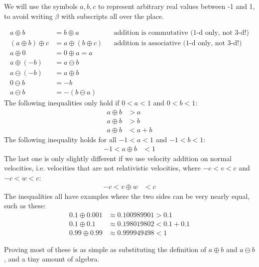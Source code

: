 \documentclass[a4paper]{article}
\theoremstyle{plain}
\theoremstyle{definition}
\begin{document}
We will use the symbols $a, b, c$ to represent arbitrary real values
between -1 and 1, to avoid writing $\beta$ with subscripts all over
the place.

\begin{align}
a \oplus b & = b \oplus a & & \text{addition is commutative (1-d only, not 3-d!)} \label{defn:1dreladdcommutative} \\
(a \oplus b) \oplus c & = a \oplus (b \oplus c) & & \text{addition is associative (1-d only, not 3-d!)} \label{defn:1dreladdassociative} \\
a \oplus 0 & = 0 \oplus a = a \\
a \oplus (-b) & = a \ominus b \\
a \ominus (-b) & = a \oplus b \\
0 \ominus b & = -b \\
a \ominus b & = - (b \ominus a)
\end{align}
The following inequalities only hold if $0 < a < 1$ and $0 < b < 1$:
\begin{align}
a \oplus b & > a \label{inequal:reladdposlarger1} \\
a \oplus b & > b \label{inequal:reladdposlarger2} \\
a \oplus b & < a+b \label{inequal:reladdpossmallerthansum}
\end{align}
The following inequality holds for all $-1 < a < 1$ and $-1 < b < 1$:
\begin{align}
-1 < a \oplus b & < 1 \label{inequal:reladdpossmallerthanc}
\end{align}
The last one is only slightly different if we use velocity addition on
normal velocities, i.e. velocities that are not relativistic velocities,
where $-c < v < c$ and $-c < w < c$:
\begin{align}
-c < v \oplus w & < c \label{inequal:reladdpossmallerthanc2}
\end{align}
The inequalities all have examples where the two sides can be very
nearly equal, such as these:
\begin{align*}
0.1 \oplus 0.001 & \approx 0.100989901 > 0.1 \\
0.1 \oplus 0.1 & \approx 0.198019802 < 0.1+0.1 \\
0.99 \oplus 0.99 & \approx 0.999949498 < 1
\end{align*}

Proving most of these is as simple as substituting the definition of
$a \oplus b$ and $a \ominus b$, and a tiny amount of algebra.
\end{document}
